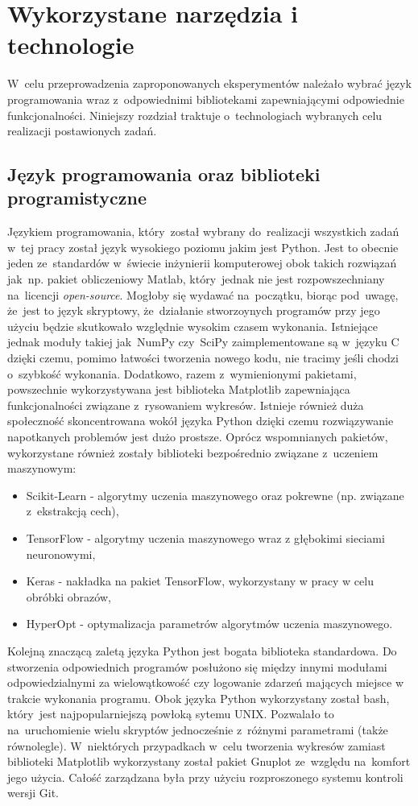 \section{Wykorzystane narzędzia i technologie} \label{tools}
W~celu przeprowadzenia zaproponowanych eksperymentów należało wybrać język programowania wraz z~odpowiednimi bibliotekami zapewniającymi odpowiednie funkcjonalności. Niniejszy rozdział traktuje o~technologiach wybranych celu realizacji postawionych zadań.
\subsection{Język programowania oraz biblioteki programistyczne}
Językiem programowania, który~został wybrany do~realizacji wszystkich zadań w~tej pracy został język wysokiego poziomu jakim jest Python. Jest to obecnie jeden ze~standardów w~świecie inżynierii komputerowej obok takich rozwiązań jak~np. pakiet obliczeniowy Matlab, który~jednak nie jest rozpowszechniany na~licencji \textit{open-source}. Mogłoby się wydawać na~początku, biorąc pod~uwagę, że~jest to język skryptowy, że~działanie stworzoynych programów przy jego użyciu będzie skutkowało względnie wysokim czasem wykonania. Istniejące jednak moduły takiej jak~NumPy czy~SciPy\cite{scipy} zaimplementowane są w~języku C dzięki czemu, pomimo łatwości tworzenia nowego kodu, nie tracimy jeśli chodzi o~szybkość wykonania. Dodatkowo, razem z~wymienionymi pakietami, powszechnie wykorzystywana jest biblioteka Matplotlib\cite{matplotlib} zapewniająca funkcjonalności związane z~rysowaniem wykresów. Istnieje również duża społeczność skoncentrowana wokół języka Python dzięki czemu rozwiązywanie napotkanych problemów jest dużo prostsze. Oprócz wspomnianych pakietów, wykorzystane również zostały biblioteki bezpośrednio związane z~uczeniem maszynowym:
\begin{itemize}
\item Scikit-Learn\cite{scikit} - algorytmy uczenia maszynowego oraz pokrewne (np. związane z~ekstrakcją cech),
\item TensorFlow\cite{tensorflow} - algorytmy uczenia maszynowego wraz z głębokimi sieciami neuronowymi,
\item Keras\cite{keras} - nakładka na pakiet TensorFlow, wykorzystany w pracy w celu obróbki obrazów,
\item HyperOpt\cite{hyperopt} - optymalizacja parametrów algorytmów uczenia maszynowego.
\end{itemize}
Kolejną znaczącą zaletą języka Python jest bogata biblioteka standardowa. Do stworzenia odpowiednich programów posłużono się między innymi modułami odpowiedzialnymi za wielowątkowość czy logowanie zdarzeń mających miejsce w trakcie wykonania programu. Obok języka Python wykorzystany został bash, który~jest najpopularniejszą powłoką sytemu UNIX. Pozwalało to na~uruchomienie wielu skryptów jednocześnie z~różnymi parametrami (także równolegle). W~niektórych przypadkach w~celu tworzenia wykresów zamiast biblioteki Matplotlib wykorzystany został pakiet Gnuplot ze~względu na~komfort jego użycia. Całość zarządzana była przy użyciu rozproszonego systemu kontroli wersji Git.

